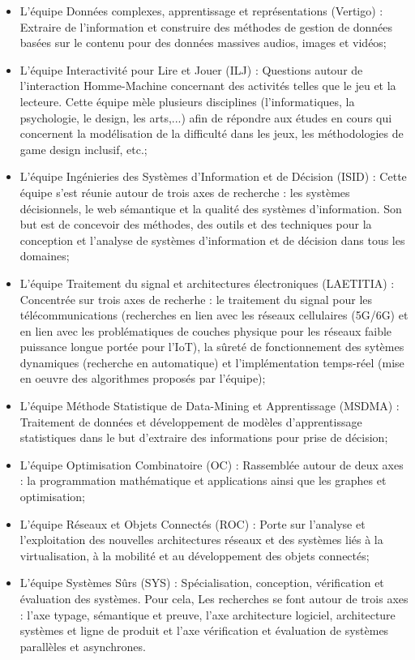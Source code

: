 \documentclass[11pt]{article}
\begin{document}
	\begin{itemize}
		\item L'équipe Données complexes, apprentissage et représentations (Vertigo) : Extraire de l'information et construire des méthodes de gestion de données basées sur le contenu pour des données massives audios, images et vidéos;
		\item L'équipe Interactivité pour Lire et Jouer (ILJ) : Questions autour de l'interaction Homme-Machine concernant des activités telles que le jeu et la lecteure. Cette équipe mèle plusieurs disciplines (l'informatiques, la psychologie, le design, les arts,...) afin de répondre aux études en cours qui concernent la modélisation de la difficulté dans les jeux, les méthodologies de game design inclusif, etc.;
		\item L'équipe Ingénieries des Systèmes d'Information et de Décision (ISID) : Cette équipe s'est réunie autour de trois axes de recherche : les systèmes décisionnels, le web sémantique et la qualité des systèmes d'information. Son but est de concevoir des méthodes, des outils et des techniques	pour la conception et l'analyse de systèmes d'information et de décision dans tous les domaines;
		\item L'équipe Traitement du signal et architectures électroniques (LAETITIA) : Concentrée sur trois axes de recherhe : le traitement du signal pour les télécommunications (recherches en lien avec les réseaux cellulaires (5G/6G) et en lien avec les problématiques de couches physique pour les réseaux faible puissance longue portée pour l'IoT), la sûreté de fonctionnement des sytèmes dynamiques (recherche en automatique) et l'implémentation temps-réel (mise en oeuvre des algorithmes proposés par l'équipe);
		\item L'équipe Méthode Statistique de Data-Mining et Apprentissage (MSDMA) : Traitement de données et développement de modèles d'apprentissage statistiques dans le but d'extraire des informations pour prise de décision;
		\item L'équipe Optimisation Combinatoire (OC) : Rassemblée autour de deux axes : la programmation mathématique et applications ainsi que les graphes et optimisation;
		\item L'équipe Réseaux et Objets Connectés (ROC) : Porte sur l'analyse et l'exploitation des nouvelles architectures réseaux et des systèmes liés à la virtualisation, à la mobilité et au développement des objets connectés;
		\item L'équipe Systèmes Sûrs (SYS) : Spécialisation, conception, vérification et évaluation des systèmes. Pour cela, Les recherches se font autour de trois axes : l'axe typage, sémantique et preuve, l'axe architecture logiciel, architecture systèmes et ligne de produit et l'axe vérification et évaluation de systèmes parallèles et asynchrones.
	\end{itemize}
\end{document}
